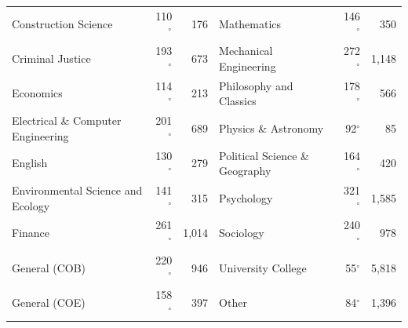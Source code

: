 \begin{table}[hbp]
\begin{tabular}{>{\raggedright\arraybackslash}p{5.0cm}rr@{\quad}>{\raggedright\arraybackslash}p{5.0cm}rr}
    Construction Science & 110$^\circ$ & 176 & Mathematics & 146$^\circ$ & 350 \\
    Criminal Justice & 193$^\circ$ & 673 & Mechanical Engineering & 272$^\circ$ & 1,148 \\
    Economics & 114$^\circ$ & 213 & Philosophy and Classics & 178$^\circ$ & 566 \\
    Electrical \& Computer Engineering & 201$^\circ$ & 689 & Physics \& Astronomy & 92$^\circ$ & 85 \\
    English & 130$^\circ$ & 279 & Political Science \& Geography & 164$^\circ$ & 420 \\
    Environmental Science and Ecology & 141$^\circ$ & 315 & Psychology & 321$^\circ$ & 1,585 \\
    Finance & 261$^\circ$ & 1,014 & Sociology & 240$^\circ$ & 978 \\
    General (COB) & 220$^\circ$ & 946 & University College & 55$^\circ$ & 5,818 \\
    General (COE) & 158$^\circ$ & 397 & Other & 84$^\circ$ & 1,396 \\
    \bottomrule
  \end{tabular}
\end{table}
